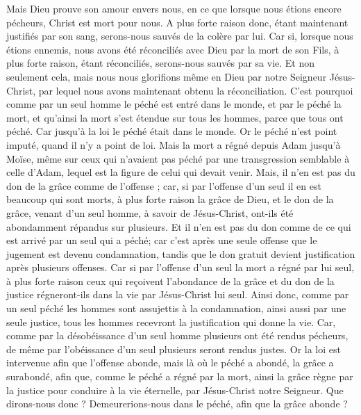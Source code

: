 \begin{multicols}{2}
Mais Dieu prouve son amour envers nous, en ce que lorsque nous étions encore pécheurs, Christ est mort pour nous.
A plus forte raison donc, étant maintenant justifiés par son sang, serons-nous sauvés de la colère par lui.
Car si, lorsque nous étions ennemis, nous avons été réconciliés avec Dieu par la mort de son Fils, à plus forte raison, étant réconciliés, serons-nous sauvés par sa vie.
Et non seulement cela, mais nous nous glorifions même en Dieu par notre Seigneur Jésus-Christ, par lequel nous avons maintenant obtenu la réconciliation.
C'est pourquoi comme par un seul homme le péché est entré dans le monde, et par le péché la mort, et qu'ainsi la mort s'est étendue sur tous les hommes, parce que tous ont péché.
Car jusqu'à la loi le péché était dans le monde. Or le péché n'est point imputé, quand il n'y a point de loi.
Mais la mort a régné depuis Adam jusqu'à Moïse, même sur ceux qui n'avaient pas péché par une transgression semblable à celle d'Adam, lequel est la figure de celui qui devait venir.
Mais, il n'en est pas du don de la grâce comme de l'offense ; car, si par l'offense d'un seul il en est beaucoup qui sont morts, à plus forte raison la grâce de Dieu, et le don de la grâce, venant d'un seul homme, à savoir de Jésus-Christ, ont-ils été abondamment répandus sur plusieurs.
Et il n'en est pas du don comme de ce qui est arrivé par un seul qui a péché; car c'est après une seule offense que le jugement est devenu condamnation, tandis que le don gratuit devient justification après plusieurs offenses.
Car si par l'offense d'un seul la mort a régné par lui seul, à plus forte raison ceux qui reçoivent l'abondance de la grâce et du don de la justice régneront-ils dans la vie par Jésus-Christ lui seul.
Ainsi donc, comme par un seul péché les hommes sont assujettis à la condamnation, ainsi aussi par une seule justice, tous les hommes recevront la justification qui donne la vie.
Car, comme par la désobéissance d'un seul homme plusieurs ont été rendus pécheurs, de même par l'obéissance d'un seul plusieurs seront rendus justes.
Or la loi est intervenue afin que l'offense abonde, mais là où le péché a abondé, la grâce a surabondé,
afin que, comme le péché a régné par la mort, ainsi la grâce règne par la justice pour conduire à la vie éternelle, par Jésus-Christ notre Seigneur.
\VerseOne{}Que dirons-nous donc ? Demeurerions-nous dans le péché, afin que la grâce abonde ?

\end{multicols}
